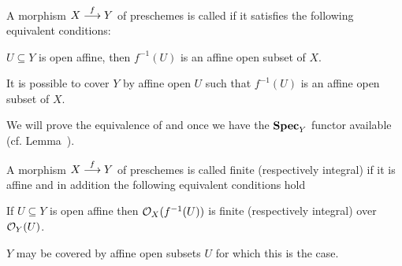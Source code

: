 \documentclass[a4paper,parskip=half,numbers=enddot, DIV=12]{scrreprt}
\begin{document}
\begin{defi} 
    A morphism $X\morphism[f] Y$ of preschemes is called  if it satisfies the following equivalent conditions:
    \begin{alphanumerate}
    \item 
        $U\subseteq Y$ is open affine, then $f^{-1}(U)$ is an affine open subset of $X$.
    \item 
        It is possible to cover $Y$ by affine open $U$ such that $f^{-1}(U)$ is an affine open subset of $X$.
    \end{alphanumerate}
\end{defi}
We will prove the equivalence of  and  once we have the $\operatorname{\mathbf{Spec}}_Y$ functor available (cf. Lemma~).
\begin{defi}
    A morphism $X\morphism[f] Y$ of preschemes is called finite (respectively integral) if it is affine and in addition the following equivalent conditions hold
    \begin{alphanumerate}
    \item 
        If $U\subseteq Y$ is open affine then $\mathcal{O}_X(f^{-1}(U))$ is finite (respectively integral) over $\mathcal{O}_Y(U)$.
    \item 
        $Y$ may be covered by affine open subsets $U$ for which this is the case. 
    \end{alphanumerate}
\end{defi}
\end{document}
